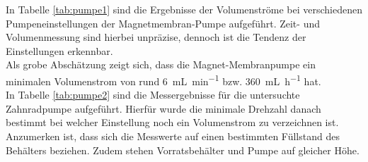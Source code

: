 In Tabelle \ref{tab:pumpe1} sind die Ergebnisse der Volumenströme bei verschiedenen Pumpeneinstellungen der Magnetmembran-Pumpe aufgeführt. Zeit- und Volumenmessung sind hierbei unpräzise, dennoch ist die Tendenz der Einstellungen erkennbar.\\
Als grobe Abschätzung zeigt sich, dass die Magnet-Membranpumpe ein minimalen Volumenstrom von rund \SI{6}{\milli \liter \per \minute} bzw. \SI{360}{\milli \liter \per \hour} hat.\\
In Tabelle \ref{tab:pumpe2} sind die Messergebnisse für die untersuchte Zahnradpumpe aufgeführt. Hierfür wurde die minimale Drehzahl danach bestimmt bei welcher Einstellung noch ein Volumenstrom zu verzeichnen ist. Anzumerken ist, dass sich die Messwerte auf einen bestimmten Füllstand des Behälters beziehen. Zudem stehen Vorratsbehälter und Pumpe auf gleicher Höhe. 
\begin{table}[h!]
	\renewcommand*{\arraystretch}{1.2}
	\centering
	\caption{Volumenströme der Magnet-Membranpumpe in verschiedenen Einstellungen}
	\label{tab:pumpe1}
\end{table}%

